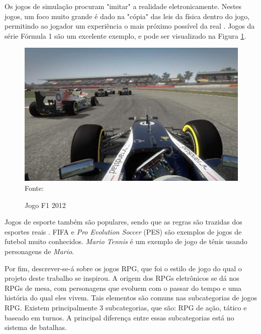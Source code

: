 \documentclass[
	12pt,					%
	openright,				%
	oneside,				%
	a4paper,				%
	bibjustif,				%
	chapter=TITLE,			%
	english,				%
	brazil,					%
	]{abntex2}
\newcommand{\source}[1]{\small Fonte: {#1}}
\begin{document}
		Os jogos de simulação procuram "imitar"{} a realidade eletronicamente.
		Nestes jogos, um foco muito grande é dado na "cópia"{} das leis da física dentro do jogo,
		permitindo ao jogador um experiência o mais próximo possível da real \cite{gameGenres}.
		Jogos da série Fórmula 1 são um excelente exemplo,
		e pode ser visualizado na Figura \ref{fig:formula1}.
		
		\begin{figure}[ht!]
			\caption{Jogo F1 2012}
			\centering
			\includegraphics[scale=0.75]{img/formula1.jpg}\\
			\vspace{0.5mm}
			\source{}
			\label{fig:formula1}
		\end{figure}
		
		Jogos de esporte também são populares,
		sendo que as regras são trazidas dos esportes reais \cite{gameGenres}.
		FIFA e \textit{Pro Evolution Soccer} (PES) são exemplos de jogos de futebol muito conhecidos.
		\textit{Mario Tennis} é um exemplo de jogo de tênis usando personagens de \textit{Mario}.
		
		Por fim, descrever-se-á sobre os jogos RPG,
		que foi o estilo de jogo do qual o projeto deste trabalho se inspirou.
		A origem dos RPGs eletrônicos se dá nos RPGs de mesa,
		com personagens que evoluem com o passar do tempo
		e uma história do qual eles vivem.
		Tais elementos são comuns nas subcategorias de jogos RPG.
		Existem principalmente 3 subcategorias,
		que são: RPG de ação, tático e baseado em turnos.
		A principal diferença entre essas subcategorias está no sistema de batalhas.
		
\end{document}
